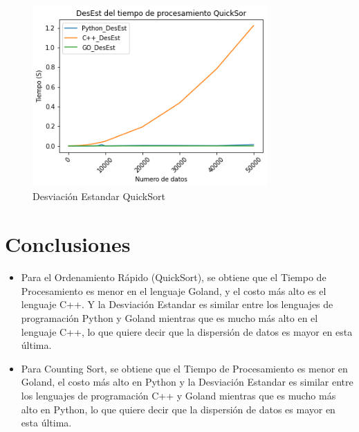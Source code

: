 \documentclass{article}
\begin{document}
\begin{enumerate}
\begin{figure}[H]
\centering
\includegraphics[width=0.8\textwidth]{Imagen/DE_QuickSort.png}
\caption{Desviación Estandar QuickSort}
\label{fig:QuickSort}
\end{figure}
  
        
        
        
    \end{enumerate}

\section{Conclusiones}

\begin{itemize}
            \item Para el Ordenamiento Rápido (QuickSort), se obtiene que el Tiempo de Procesamiento es menor en el lenguaje Goland, y el costo más alto es el lenguaje C++. Y la Desviación Estandar es similar entre los lenguajes de programación Python y Goland mientras que es mucho más alto en el lenguaje C++, lo que quiere decir que la dispersión de datos es mayor en esta última.
\end{itemize}
\begin{itemize}
            \item Para Counting Sort, se obtiene que el Tiempo de Procesamiento es menor en Goland, el costo más alto en Python y la Desviación Estandar es similar entre los lenguajes de programación C++ y Goland mientras que es mucho más alto en Python, lo que quiere decir que la dispersión de datos es mayor en esta última.
\end{itemize}

    
	
		
	
\end{document}
